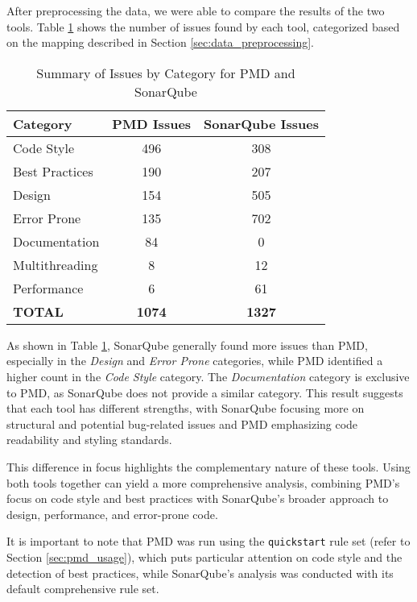 After preprocessing the data, we were able to compare the results of the two tools. Table \ref{tab:sonarqube_pmd_comparison} shows the number of issues found by each tool, categorized based on the mapping described in Section \ref{sec:data_preprocessing}.

\begin{table}[H]
  \centering
  \begin{tabular}{|l|c|c|}
  \hline
  \textbf{Category} & \textbf{PMD Issues} & \textbf{SonarQube Issues} \\
  \hline
  Code Style           & 496 & 308 \\
  Best Practices       & 190 & 207 \\
  Design               & 154 & 505 \\
  Error Prone          & 135 & 702 \\
  Documentation        & 84  & 0 \\
  Multithreading       & 8   & 12 \\
  Performance          & 6   & 61 \\
  \textbf{TOTAL}       & \textbf{1074} & \textbf{1327} \\
  \hline
  \end{tabular}
  \caption{Summary of Issues by Category for PMD and SonarQube}
  \label{tab:sonarqube_pmd_comparison}
\end{table}

\noindent As shown in Table \ref{tab:sonarqube_pmd_comparison}, SonarQube generally found more issues than PMD, especially in the \textit{Design} and \textit{Error Prone} categories, while PMD identified a higher count in the \textit{Code Style} category. The \textit{Documentation} category is exclusive to PMD, as SonarQube does not provide a similar category. This result suggests that each tool has different strengths, with SonarQube focusing more on structural and potential bug-related issues and PMD emphasizing code readability and styling standards.

This difference in focus highlights the complementary nature of these tools. Using both tools together can yield a more comprehensive analysis, combining PMD's focus on code style and best practices with SonarQube's broader approach to design, performance, and error-prone code.

It is important to note that PMD was run using the \texttt{quickstart} rule set (refer to Section \ref{sec:pmd_usage}), which puts particular attention on code style and the detection of best practices, while SonarQube’s analysis was conducted with its default comprehensive rule set. 

